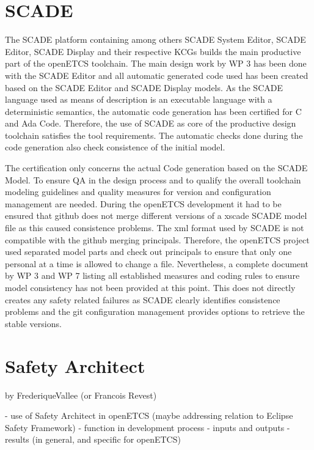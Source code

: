 \documentclass{template/openetcs_report}
\begin{document}
\section{SCADE}

The SCADE platform containing among others SCADE System Editor, SCADE Editor, SCADE Display and their respective KCGs builds the main productive part of the openETCS toolchain. The main design work by WP 3 has been done with the SCADE Editor and all automatic generated code used has been created based on the SCADE Editor and SCADE Display models. As the SCADE language used as means of description is  an executable language with a deterministic semantics, the automatic code generation has been certified for C and Ada Code. Therefore, the use of SCADE as core of the productive design toolchain satisfies the tool requirements. The automatic checks done during the code generation also check consistence of the initial model.

The certification only concerns the actual Code generation based on the SCADE Model. To ensure QA in the design process and to qualify the overall toolchain modeling guidelines and quality measures for version and configuration management are needed. During the openETCS development it had to be ensured that github does not merge different versions of a xscade SCADE model file as this caused consistence problems. The xml format used by SCADE is not compatible with the github merging principals. Therefore, the openETCS project used separated model parts and check out principals to ensure that only one personal at a time is allowed to change a file. Nevertheless, a complete document by WP 3 and WP 7 listing all established measures and coding rules to ensure model consistency has not been provided at this point. This does not directly creates any safety related failures as SCADE clearly identifies consistence problems and the git configuration management provides options to retrieve the stable versions.


\section{Safety Architect}

by FrederiqueVallee (or Francois Revest)

- use of Safety Architect in openETCS (maybe addressing relation to Eclipse Safety Framework)
- function in development process
- inputs and outputs
- results (in general, and specific for openETCS)
\end{document}

